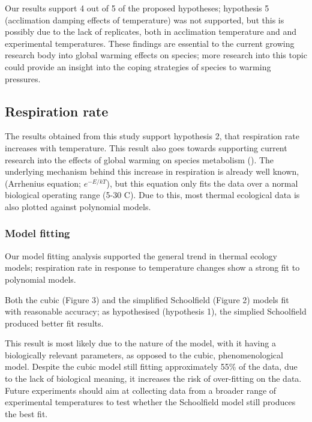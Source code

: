 \documentclass[../../Paper.tex]{subfiles}
\begin{document}
Our results support 4 out of 5 of the proposed hypotheses; hypothesis 5 (acclimation
damping effects of temperature) was not supported, but this is possibly due to the lack of replicates, both 
in acclimation temperature and and experimental temperatures.
These findings are essential to the current growing research body into global warming effects on species; 
more research into this topic could provide an insight into the coping strategies of species to warming pressures. 

\subsection*{Respiration rate}

The results obtained from this study support hypothesis 2, that respiration rate increases with 
temperature. This result also goes towards supporting current research into the effects of global warming
on species metabolism (\cite{grigaltchik_thermal_2012,sentis_using_2012}). The underlying mechanism behind this increase in respiration is already
well known, (Arrhenius equation; $e^{−E/kT}$), but this equation only fits the data over a normal biological operating range (5-30
\degree C). Due to this, most thermal ecological data is also plotted against polynomial models.

\subsubsection*{Model fitting}

Our model fitting analysis supported the general trend in thermal ecology models; respiration rate in
response to temperature changes show a strong fit to polynomial models. 

Both the cubic (Figure 3) and the simplified 
Schoolfield (Figure 2) models fit with reasonable accuracy; as hypothesised (hypothesis 1), the simplied 
Schoolfield produced better fit results. 

This result is most likely due to the nature of the model, with it having a biologically relevant parameters, as
opposed to the cubic, phenomenological model. Despite the cubic model still fitting approximately 
55\% of the data, due to the lack of biological meaning, it increases the risk of over-fitting 
on the data. Future experiments should aim at collecting data from a broader range of experimental temperatures
to test whether the Schoolfield model still produces the best fit. 
\end{document}
